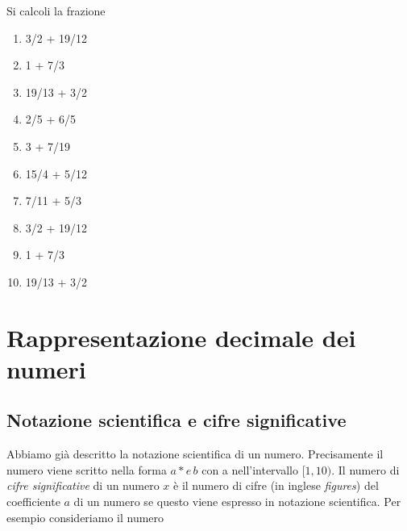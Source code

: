 \documentclass[onecolumn,11pt]{book}\usepackage[]{graphicx}\usepackage[]{color}
\makeatletter
\newcommand{\hlnum}[1]{\textcolor[rgb]{0.686,0.059,0.569}{#1}}%
\newcommand{\hlopt}[1]{\textcolor[rgb]{0,0,0}{#1}}%
\newcommand{\hlstd}[1]{\textcolor[rgb]{0.345,0.345,0.345}{#1}}%
\newcommand{\hlkwb}[1]{\textcolor[rgb]{0.69,0.353,0.396}{#1}}%
\newcommand{\hlkwd}[1]{\textcolor[rgb]{0.737,0.353,0.396}{\textbf{#1}}}%
\newenvironment{kframe}{%
 \def\at@end@of@kframe{}%
 \ifinner\ifhmode%
  \def\at@end@of@kframe{\end{minipage}}%
  \begin{minipage}{\columnwidth}%
 \fi\fi%
 \def\FrameCommand##1{\hskip\@totalleftmargin \hskip-\fboxsep
 \colorbox{shadecolor}{##1}\hskip-\fboxsep
     \hskip-\linewidth \hskip-\@totalleftmargin \hskip\columnwidth}%
 \MakeFramed {\advance\hsize-\width
   \@totalleftmargin\z@ \linewidth\hsize
   \@setminipage}}%
 {\par\unskip\endMakeFramed%
 \at@end@of@kframe}
\newenvironment{knitrout}{}{} %
\newcommand{\rpr}{\textsf{R}~}
\makeatother
\begin{document}
Si calcoli la frazione
\begin{enumerate}

\item  3/2 + 19/12
\item  1 + 7/3
\item  19/13 + 3/2
\item  2/5 + 6/5
\item  3 + 7/19
\item  15/4 + 5/12
\item  7/11 + 5/3
\item  3/2 + 19/12
\item  1 + 7/3
\item  19/13 + 3/2
\end{enumerate}

\section{Rappresentazione decimale dei numeri}
\subsection{Notazione scientifica e cifre significative}
Abbiamo gi\`a descritto la notazione scientifica di un numero.  Precisamente  il numero viene scritto nella forma $a*e \,b$ con a nell'intervallo $[1,10)$.
Il numero di \emph{cifre significative}  di un numero $x$ \`e  il numero di cifre (in inglese \emph{figures}) del coefficiente $a$ di un  numero se questo viene espresso in notazione scientifica.
Per esempio consideriamo il numero
\end{document}
